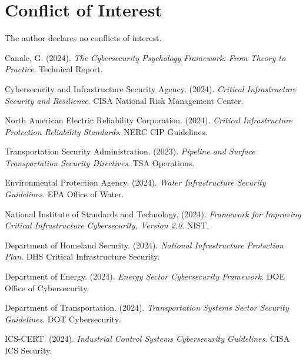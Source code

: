 \documentclass[10pt, twocolumn]{article}
\begin{document}
\section*{Conflict of Interest}

The author declares no conflicts of interest.

\begin{thebibliography}{99}

Canale, G. (2024). \textit{The Cybersecurity Psychology Framework: From Theory to Practice}. Technical Report.

Cybersecurity and Infrastructure Security Agency. (2024). \textit{Critical Infrastructure Security and Resilience}. CISA National Risk Management Center.

North American Electric Reliability Corporation. (2024). \textit{Critical Infrastructure Protection Reliability Standards}. NERC CIP Guidelines.

Transportation Security Administration. (2023). \textit{Pipeline and Surface Transportation Security Directives}. TSA Operations.

Environmental Protection Agency. (2024). \textit{Water Infrastructure Security Guidelines}. EPA Office of Water.

National Institute of Standards and Technology. (2024). \textit{Framework for Improving Critical Infrastructure Cybersecurity, Version 2.0}. NIST.

Department of Homeland Security. (2024). \textit{National Infrastructure Protection Plan}. DHS Critical Infrastructure Security.

Department of Energy. (2024). \textit{Energy Sector Cybersecurity Framework}. DOE Office of Cybersecurity.

Department of Transportation. (2024). \textit{Transportation Systems Sector Security Guidelines}. DOT Cybersecurity.

ICS-CERT. (2024). \textit{Industrial Control Systems Cybersecurity Guidelines}. CISA ICS Security.

\end{thebibliography}
\end{document}
